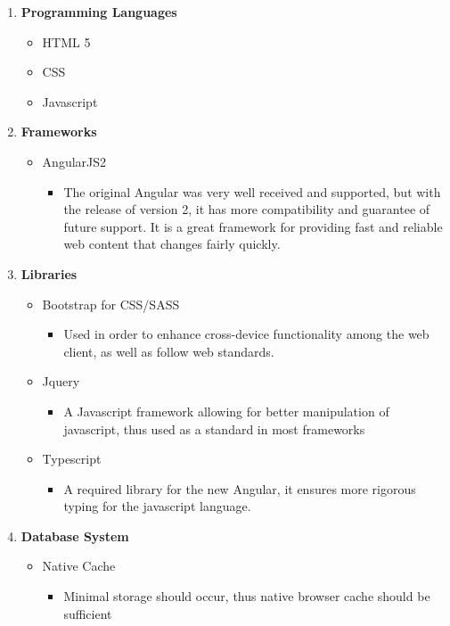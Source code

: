 \documentclass{article}
\begin{document}
		\begin{enumerate}
			\item \textbf{Programming Languages}
			\begin{itemize}
				\item HTML 5
				\item CSS
				\item Javascript
			\end{itemize}
			\item \textbf{Frameworks}
			\begin{itemize}
				\item AngularJS2
				\begin{itemize}
					\item The original Angular was very well received and supported, but with the release of version 2, it has more compatibility and guarantee of future support. It is a great framework for providing fast and reliable web content that changes fairly quickly.
				\end{itemize}
			\end{itemize}
			\item \textbf{Libraries}
			\begin{itemize}
				\item Bootstrap for CSS/SASS
				\begin{itemize}
					\item Used in order to enhance cross-device functionality among the web client, as well as follow web standards.
				\end{itemize}
				\item Jquery
				\begin{itemize}
					\item A Javascript framework allowing for better manipulation of javascript, thus used as a standard in most frameworks
				\end{itemize}
				\item Typescript
				\begin{itemize}
					\item A required library for the new Angular, it ensures more rigorous typing for the javascript language.
				\end{itemize}
			\end{itemize}
			\item \textbf{Database System}
			\begin{itemize}
				\item Native Cache
				\begin{itemize}
					\item Minimal storage should occur, thus native browser cache should be sufficient

\end{itemize}
\end{itemize}
\end{enumerate}
\end{document}
